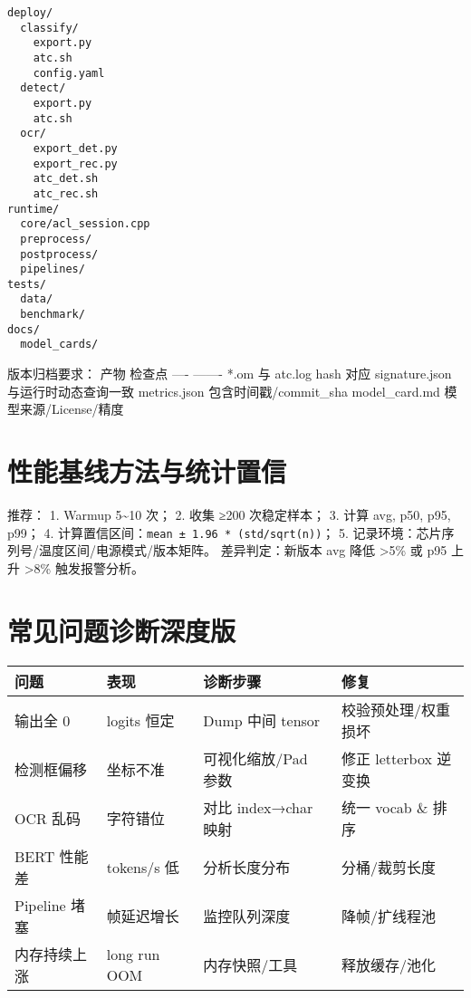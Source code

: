 \begin{lstlisting}
deploy/
  classify/
    export.py
    atc.sh
    config.yaml
  detect/
    export.py
    atc.sh
  ocr/
    export_det.py
    export_rec.py
    atc_det.sh
    atc_rec.sh
runtime/
  core/acl_session.cpp
  preprocess/
  postprocess/
  pipelines/
tests/
  data/
  benchmark/
docs/
  model_cards/
\end{lstlisting}

版本归档要求： \textbar{} 产物 \textbar{} 检查点 \textbar{} \textbar{}
---- \textbar{} ------- \textbar{} \textbar{} *.om \textbar{} 与 atc.log
hash 对应 \textbar{} \textbar{} signature.json \textbar{}
与运行时动态查询一致 \textbar{} \textbar{} metrics.json \textbar{}
包含时间戳/commit\_sha \textbar{} \textbar{} model\_card.md \textbar{}
模型来源/License/精度 \textbar{}

\section{性能基线方法与统计置信}\label{ux6027ux80fdux57faux7ebfux65b9ux6cd5ux4e0eux7edfux8ba1ux7f6eux4fe1}

推荐： 1. Warmup 5\textasciitilde10 次； 2. 收集 ≥200 次稳定样本； 3.
计算 avg, p50, p95, p99； 4.
计算置信区间：\passthrough{\lstinline!mean ± 1.96 * (std/sqrt(n))!}； 5.
记录环境：芯片序列号/温度区间/电源模式/版本矩阵。 差异判定：新版本 avg
降低 \textgreater5\% 或 p95 上升 \textgreater8\% 触发报警分析。

\section{常见问题诊断深度版}\label{ux5e38ux89c1ux95eeux9898ux8bcaux65adux6df1ux5ea6ux7248}

\begin{longtable}[]{@{}llll@{}}
\toprule\noalign{}
问题 & 表现 & 诊断步骤 & 修复 \\
\midrule\noalign{}
\endhead
\bottomrule\noalign{}
\endlastfoot
输出全 0 & logits 恒定 & Dump 中间 tensor & 校验预处理/权重损坏 \\
检测框偏移 & 坐标不准 & 可视化缩放/Pad 参数 & 修正 letterbox 逆变换 \\
OCR 乱码 & 字符错位 & 对比 index→char 映射 & 统一 vocab \& 排序 \\
BERT 性能差 & tokens/s 低 & 分析长度分布 & 分桶/裁剪长度 \\
Pipeline 堵塞 & 帧延迟增长 & 监控队列深度 & 降帧/扩线程池 \\
内存持续上涨 & long run OOM & 内存快照/工具 & 释放缓存/池化 \\
\end{longtable}

